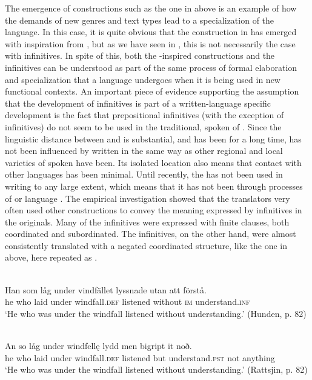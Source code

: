 \documentclass[output=paper]{langscibook}
\begin{document}
The emergence of constructions such as the one in  above is an example of how the demands of new genres and text types lead to a specialization of the language. In this case, it is quite obvious that the construction in  has emerged with inspiration from , but as we have seen in , this is not necessarily the case with  infinitives. In spite of this, both the -inspired constructions and the  infinitives can be understood as part of the same process of formal elaboration and specialization that a language undergoes when it is being used in new functional contexts. An important piece of evidence supporting the assumption that the development of  infinitives is part of a written-language specific development is the fact that prepositional  infinitives (with the exception of  infinitives) do not seem to be used in the traditional, spoken  of . Since the linguistic distance between  and  is substantial, and has been for a long time,  has not been influenced by written  in the same way as other regional and local varieties of spoken  have been. Its isolated location also means that contact with other languages has been minimal. Until recently, the  has not been used in writing to any large extent, which means that it has not been through processes of  or language . The empirical investigation showed that the  translators very often used other constructions to convey the meaning expressed by  infinitives in the  originals. Many of the  infinitives were expressed with finite clauses, both coordinated and subordinated. The  infinitives, on the other hand, were almost consistently translated with a negated coordinated structure, like the one in  above, here repeated as .


\ea
\label{ex:kalm:35}
\ea {} \\
\gll Han som låg under vindfället lyssnade utan att förstå.\\
 he who laid under windfall.\textsc{def} listened without \textsc{im} understand.\textsc{inf}\\
\glt ‘He who was under the windfall listened without understanding.’ (Hunden, p. 82)

\ex {}\\
\gll An so låg under windfellę lydd men bigript it noð.\\
he who laid under windfall.\textsc{def} listened but understand.\textsc{pst} not anything\\
\glt ‘He who was under the windfall listened without understanding.’ (Rattsjin, p. 82)
\z
\z
\end{document}
